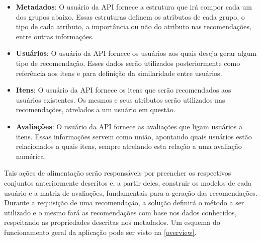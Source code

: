\documentclass[12pt, openright, oneside, a4paper, brazil]{abntex2}
\begin{document}
\begin{itemize}
	\item \textbf{Metadados}: O usuário da API fornece a estrutura que irá compor cada um dos grupos abaixo. Essas estruturas definem os atributos de cada grupo, o tipo de cada atributo, a importância ou não do atributo nas recomendações, entre outras informações.

	\item \textbf{Usuários}: O usuário da API fornece os usuários aos quais deseja gerar algum tipo de recomendação. Esses dados serão utilizados posteriormente como referência aos itens e para definição da similaridade entre usuários.

	\item \textbf{Itens}: O usuário da API fornece os itens que serão recomendados aos usuários existentes. Os mesmos e seus atributos serão utilizados nas recomendações, atrelados a um usuário em questão.

	\item \textbf{Avaliações}: O usuário da API fornece as avaliações que ligam usuários a itens. Essas informações servem como união, apontando quais usuários estão relacionados a quais itens, sempre atrelando esta relação a uma avaliação numérica.
\end{itemize}

Tais ações de alimentação serão responsáveis por preencher os respectivos conjuntos anteriormente descritos e, a partir deles, construir os modelos de cada usuário e a matriz de avaliações, fundamentais para a geração das recomendações. Durante a requisição de uma recomendação, a solução definirá o método a ser utilizado e o mesmo fará as recomendações com base nos dados conhecidos, respeitando as propriedades descritas nos metadados. Um esquema do funcionamento geral da aplicação pode ser visto na \autoref{overview}.
\end{document}
